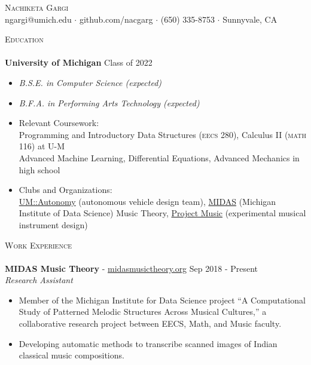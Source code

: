 \documentclass[a4paper]{article}
\newcommand{\lineunder} {
	\vspace*{-8pt} \\
	\hspace*{-18pt} \hrulefill \\
}
\newcommand{\header} [1] {
	{\hspace*{-18pt}\vspace*{6pt} \textsc{#1}}
	\vspace*{-6pt} \lineunder
}
\begin{document}
\vspace*{-33pt}
	

\begin{center}
	{\Huge \scshape {Nachiketa Gargi}}\\
	ngargi@umich.edu $\cdot$ github.com/nacgarg $\cdot$ (650) 335-8753 $\cdot$ Sunnyvale, CA \\
\end{center}
\header{Education}
\noindent
\textbf{University of Michigan} \hfill Class of 2022
\vspace{-2mm}
\begin{itemize}
	\setlength{\itemindent}{-3mm}
	\item[] \textit{B.S.E. in Computer Science (expected)}\vspace{-3mm}
	\item[] \textit{B.F.A. in Performing Arts Technology (expected)}
	\item[] Relevant Coursework: \\ Programming and Introductory Data Structures (\textsc{eecs 280}), Calculus II (\textsc{math 116}) at U-M \\ Advanced Machine Learning, Differential Equations, Advanced Mechanics in high school
	\item[] Clubs and Organizations:\\ \href{https://umautonomy.com/}{UM::Autonomy} (autonomous vehicle design team), \href{http://www.midasmusictheory.org/}{MIDAS} (Michigan Institute of Data Science) Music Theory, \href{https://michiganprojectmusic.github.io/index.html}{Project Music} (experimental musical instrument design) 
\end{itemize}

\noindent
\header{Work Experience}
\noindent
\textbf{MIDAS Music Theory} - \url{midasmusictheory.org} \hfill Sep 2018 - Present\\
\textit{Research Assistant} \\ 
\vspace{-6mm}
\begin{itemize} \itemsep 0.1pt
	\item Member of the Michigan Institute for Data Science project “A Computational Study of Patterned Melodic Structures Across Musical Cultures,” a collaborative research project between EECS, Math, and Music faculty.
	\item Developing automatic methods to transcribe scanned images of Indian classical music compositions.
\end{itemize}
\end{document}
